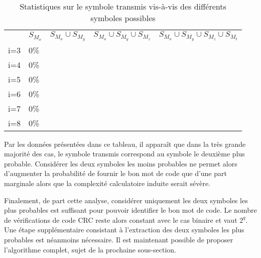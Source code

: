 \begin{table}[!tb]
    \centering
    \caption{Statistiques sur le symbole transmis vis-à-vis des différents symboles possibles}
    \label{tab:symb}
        \begin{tabular}{rllll}
            \toprule
            		& $S_{M_x}$	& $S_{M_x}\cup S_{M_y}$	& $S_{M_x}\cup S_{M_y}\cup S_{M_z}$ & $S_{M_x}\cup S_{M_y}\cup S_{M_z}\cup S_{M_t}$ \\
            \cmidrule(l){2-2}\cmidrule(l){3-3}\cmidrule(l){4-4}\cmidrule(l){5-5}
            i=3     &	0\%		&			& 			&			\\
            i=4     &	0\%		&			& 			&			\\
            i=5     &	0\%		&			& 			&			\\
            i=6     &	0\%		&			& 			&			\\
            i=7     &	0\%		&			& 			&			\\
            i=8     &	0\%		&			& 			&			\\
            \bottomrule
        \end{tabular}%
\end{table}
Par les données présentées dans ce tableau, il apparaît que dans la très grande majorité des cas, le symbole transmis 
correspond au symbole le deuxième plus probable. Considérer les deux symboles les moins probables ne permet alors 
d'augmenter la probabilité de fournir le bon mot de code que d'une part marginale alors que la complexité calculatoire
induite serait sévère.

Finalement, de part cette analyse, considérer uniquement les deux symboles les plus probables est suffisant pour 
pouvoir identifier le bon mot de code. Le nombre de vérifications de code CRC reste alors constant avec le cas binaire 
et vaut $2^q$. Une étape supplémentaire consistant à l'extraction des deux symboles les plus probables est néanmoins 
nécessaire. Il est maintenant possible de proposer l'algorithme complet, sujet de la prochaine sous-section.

